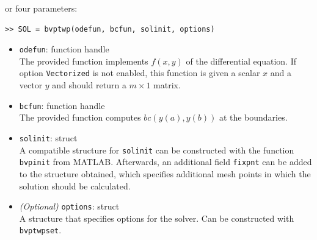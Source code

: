 \documentclass{article}
\begin{document}
or four parameters:

\begin{verbatim}
>> SOL = bvptwp(odefun, bcfun, solinit, options)
\end{verbatim}

\begin{itemize}
 \item \texttt{odefun}: function handle \\
  The provided function implements $f(x,y)$ of the differential equation. If option \texttt{Vectorized}
  is not enabled, this function is given a scalar $x$ and a vector $y$ and should return a
  $m \times 1$ matrix.
 \item \texttt{bcfun}: function handle \\
  The provided function computes $bc(y(a),y(b))$ at the boundaries.
 \item \texttt{solinit}: struct\\
 A compatible structure for \texttt{solinit} can be constructed with the function
\texttt{bvpinit} from MATLAB. Afterwards, an additional field  \texttt{fixpnt} can be added to the
 structure obtained, which specifies additional mesh points in which the solution should
be calculated.
\item \textit{(Optional)} \texttt{options}: struct \\
  A structure that specifies options for the solver. Can be constructed with \texttt{bvptwpset}.
  \end{itemize}
\end{document}
